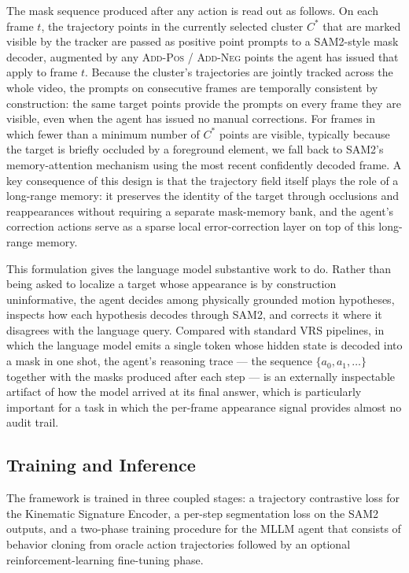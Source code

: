 \documentclass[11pt]{article}
\begin{document}
The mask sequence produced after any action is read out as follows.
On each frame $t$, the trajectory points in the currently selected cluster $C^*$ that are marked visible by the tracker are passed as positive point prompts to a SAM2-style mask decoder, augmented by any \textsc{Add-Pos} / \textsc{Add-Neg} points the agent has issued that apply to frame $t$.
Because the cluster's trajectories are jointly tracked across the whole video, the prompts on consecutive frames are temporally consistent by construction: the same target points provide the prompts on every frame they are visible, even when the agent has issued no manual corrections.
For frames in which fewer than a minimum number of $C^*$ points are visible, typically because the target is briefly occluded by a foreground element, we fall back to SAM2's memory-attention mechanism using the most recent confidently decoded frame.
A key consequence of this design is that the trajectory field itself plays the role of a long-range memory: it preserves the identity of the target through occlusions and reappearances without requiring a separate mask-memory bank, and the agent's correction actions serve as a sparse local error-correction layer on top of this long-range memory.

This formulation gives the language model substantive work to do.
Rather than being asked to localize a target whose appearance is by construction uninformative, the agent decides among physically grounded motion hypotheses, inspects how each hypothesis decodes through SAM2, and corrects it where it disagrees with the language query.
Compared with standard VRS pipelines, in which the language model emits a single token whose hidden state is decoded into a mask in one shot, the agent's reasoning trace --- the sequence $\{a_0,a_1,\dots\}$ together with the masks produced after each step --- is an externally inspectable artifact of how the model arrived at its final answer, which is particularly important for a task in which the per-frame appearance signal provides almost no audit trail.

\subsection{Training and Inference}

The framework is trained in three coupled stages: a trajectory contrastive loss for the Kinematic Signature Encoder, a per-step segmentation loss on the SAM2 outputs, and a two-phase training procedure for the MLLM agent that consists of behavior cloning from oracle action trajectories followed by an optional reinforcement-learning fine-tuning phase.
\end{document}
